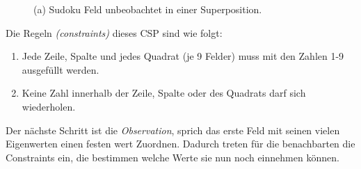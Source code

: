 \documentclass[12pt, a4paper,twoside,openright]{report}
\begin{document}
\begin{figure}[H]
    \centering
    \caption{(a) Sudoku Feld unbeobachtet in einer Superposition.}%
\end{figure}

Die Regeln \textit{(constraints)} dieses CSP sind wie folgt:
\begin{enumerate}
    \item Jede Zeile, Spalte und jedes Quadrat {(je 9 Felder)} muss mit den Zahlen 1-9 ausgefüllt werden.
    \item Keine Zahl innerhalb der Zeile, Spalte oder des Quadrats darf sich wiederholen.
\end{enumerate}

Der nächste Schritt ist die \textit{Observation}, sprich das erste Feld mit seinen vielen Eigenwerten einen festen wert Zuordnen.
Dadurch treten für die benachbarten die Constraints ein, die bestimmen welche Werte sie nun noch einnehmen können.
\end{document}
